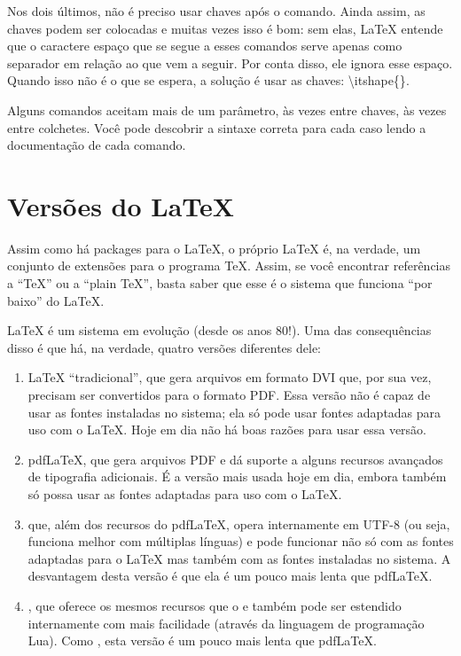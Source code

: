Nos dois últimos, não é preciso usar chaves após o comando. Ainda assim, as
chaves podem ser colocadas e muitas vezes isso é bom: sem elas, \LaTeX{}
entende que o caractere espaço que se segue a esses comandos serve apenas
como separador em relação ao que vem a seguir. Por conta disso, ele ignora
esse espaço. Quando isso não é o que se espera, a solução é usar as chaves:
\textsf{\textbackslash{}itshape\{\}}.

Alguns comandos aceitam mais de um parâmetro, às vezes entre chaves, às
vezes entre colchetes. Você pode descobrir a sintaxe correta para cada caso
lendo a documentação de cada comando.

\section{Versões do \LaTeX{}}

Assim como há packages para o \LaTeX{}, o próprio \LaTeX{} é, na verdade, um
conjunto de extensões para o programa \TeX{}. Assim, se você encontrar
referências a ``\TeX{}'' ou a ``plain \TeX{}'', basta saber que esse é o
sistema que funciona ``por baixo'' do \LaTeX{}.

\LaTeX{} é um sistema em evolução (desde os anos 80!). Uma das consequências
disso é que há, na verdade, quatro versões diferentes dele:

\begin{enumerate}
\item \LaTeX{} ``tradicional'', que gera arquivos em formato DVI que, por
sua vez, precisam ser convertidos para o formato PDF. Essa versão não é
capaz de usar as fontes instaladas no sistema; ela só pode usar fontes
adaptadas para uso com o \LaTeX{}. Hoje em dia não há boas razões para
usar essa versão.

\item pdf\LaTeX{}, que gera arquivos PDF e dá suporte a alguns recursos
avançados de tipografia adicionais. É a versão mais usada hoje em dia,
embora também só possa usar as fontes adaptadas para uso com o \LaTeX{}.

\item \XeLaTeX{} que, além dos recursos do pdf\LaTeX{}, opera internamente
em UTF-8 (ou seja, funciona melhor com múltiplas línguas) e pode funcionar
não só com as fontes adaptadas para o \LaTeX{} mas também com as fontes
instaladas no sistema. A desvantagem desta versão é que ela é um pouco
mais lenta que pdf\LaTeX{}.

\item \LuaLaTeX{}, que oferece os mesmos recursos que o \XeLaTeX{} e
também pode ser estendido internamente com mais facilidade (através da
linguagem de programação Lua). Como \XeLaTeX{}, esta versão é um pouco
mais lenta que pdf\LaTeX{}.
\end{enumerate}

